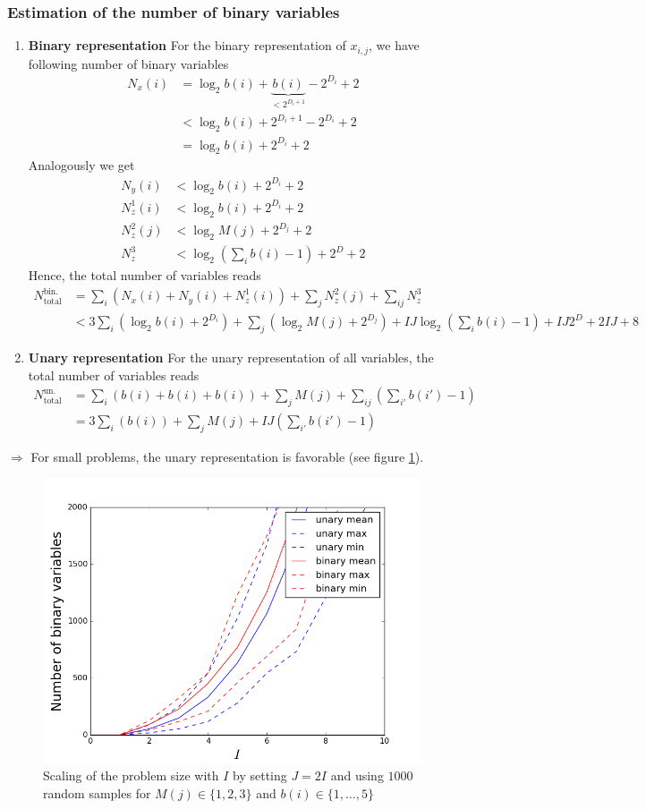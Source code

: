 \documentclass{article}
\begin{document}
\subsubsection{Estimation of the number of binary variables}
\begin{enumerate}
    \item \textbf{Binary representation}
    For the binary representation of $x_{i, j}$, we have following number of binary variables
    \begin{align*}
        N_x(i) & = \log_2 b(i) + \underbrace{b(i)}_{< 2^{D_i + 1}} - 2^{D_i} + 2 \\
               & < \log_2 b(i) + 2^{D_i + 1} - 2^{D_i} + 2 \\
               & = \log_2 b(i) + 2^{D_i} + 2 
    \end{align*}
    Analogously we get 
    \begin{align*}
        N_y(i) &< \log_2 b(i) + 2^{D_i} + 2 \\
        N_{z}^1(i) &< \log_2 b(i) + 2^{D_i} + 2 \\
        N_{z}^2(j) &< \log_2 M(j) + 2^{D_j} + 2 \\
        N_{z}^3 &< \log_2\left(\sum_i b(i) - 1\right) + 2^D + 2
    \end{align*}
    Hence, the total number of variables reads
    \begin{align*}
        N_\text{total}^\text{bin. rep.} & = \sum_i \left( N_x(i) + N_y(i) + N_{z}^1(i) \right) + \sum_j N_{z}^2(j) + \sum_{ij} N_{z}^3 \\
                                        & < 3 \sum_i \left(\log_2 b(i) + 2^{D_i}\right) + \sum_j \left(\log_2 M(j) + 2^{D_j} \right) + I J \log_2 \left( \sum_i b(i) - 1 \right) + I J 2^D  +  2 I J  + 8 
    \end{align*}
    \item \textbf{Unary representation}
    For the unary representation of all variables, the total number of variables reads
    \begin{align*}
        N_\text{total}^\text{un. rep.} & = \sum_i \left( b(i) + b(i) + b(i)\right) + \sum_j M(j) + \sum_{ij} \left(\sum_{i'} b(i') - 1\right) \\
                                       & = 3 \sum_i \left(b(i)\right) + \sum_j M(j) + I J \left(\sum_{i'} b(i') - 1\right)
    \end{align*}
\end{enumerate}
$\Rightarrow$ For small problems, the unary representation is favorable (see figure \ref{fig:problem_size}).
\begin{figure}[htpb]
    \centering
    \includegraphics[width=0.6\linewidth]{pics/problem_size}
    \caption{Scaling of the problem size with $I$ by setting $J=2I$ and using $1000$ random samples for $M(j)\in\{1,2,3\}$ and $b(i)\in\{1,\dots, 5\}$}
    \label{fig:problem_size}
\end{figure}
\end{document}

